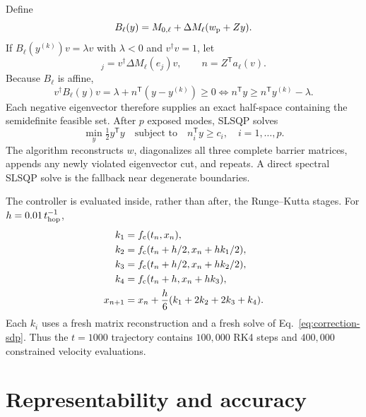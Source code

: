 \documentclass[10pt,twocolumn]{article}
\begin{document}
Define
\begin{equation}
B_\ell(y)=M_{0,\ell}+\Delta M_\ell(w_{\rm p}+Zy).
\label{eq:affine-barrier}
\end{equation}
If $B_\ell(y^{(k)})v=\lambda v$ with $\lambda<0$ and $v^\dagger v=1$, let
\begin{equation}
[a_\ell(v)]_j=v^\dagger\Delta M_\ell(e_j)v,\qquad
n=Z^\mathsf Ta_\ell(v).
\label{eq:cut-normal}
\end{equation}
Because $B_\ell$ is affine,
\begin{equation}
v^\dagger B_\ell(y)v
=\lambda+n^\mathsf T(y-y^{(k)})\geq0
\Longleftrightarrow
n^\mathsf Ty\geq n^\mathsf Ty^{(k)}-\lambda.
\label{eq:eigenvector-cut}
\end{equation}
Each negative eigenvector therefore supplies an exact half-space containing
the semidefinite feasible set.  After $p$ exposed modes, SLSQP solves
\begin{equation}
\min_y\tfrac12y^\mathsf Ty
\quad\text{subject to}\quad n_i^\mathsf Ty\geq c_i,
\quad i=1,\ldots,p.
\label{eq:cutting-plane-qp}
\end{equation}
The algorithm reconstructs $w$, diagonalizes all three complete barrier
matrices, appends any newly violated eigenvector cut, and repeats.  A direct
spectral SLSQP solve is the fallback near degenerate boundaries.

The controller is evaluated inside, rather than after, the Runge--Kutta
stages.  For $h=0.01\,t_{\rm hop}^{-1}$,
\begin{equation}
\begin{aligned}
k_1&=f_{\rm c}(t_n,x_n),\\
k_2&=f_{\rm c}(t_n+h/2,x_n+hk_1/2),\\
k_3&=f_{\rm c}(t_n+h/2,x_n+hk_2/2),\\
k_4&=f_{\rm c}(t_n+h,x_n+hk_3),\\
x_{n+1}&=x_n+\frac h6(k_1+2k_2+2k_3+k_4).
\end{aligned}
\label{eq:corrected-rk4}
\end{equation}
Each $k_i$ uses a fresh matrix reconstruction and a fresh solve of
Eq.~\eqref{eq:correction-sdp}.  Thus the $t=1000$ trajectory contains
$100{,}000$ RK4 steps and $400{,}000$ constrained velocity evaluations.

\section{Representability and accuracy}
\end{document}
